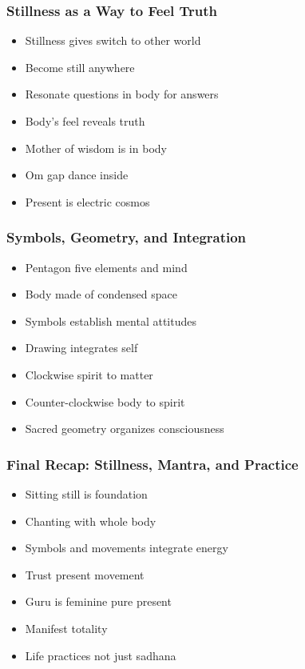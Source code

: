 \begin{frame}[fragile]\frametitle{Stillness as a Way to Feel Truth}
  \begin{itemize}
    \item Stillness gives switch to other world
    \item Become still anywhere
    \item Resonate questions in body for answers
    \item Body's feel reveals truth
    \item Mother of wisdom is in body
    \item Om gap dance inside
    \item Present is electric cosmos
  \end{itemize}
\end{frame}

\begin{frame}[fragile]\frametitle{Symbols, Geometry, and Integration}
  \begin{itemize}
    \item Pentagon five elements and mind
    \item Body made of condensed space
    \item Symbols establish mental attitudes
    \item Drawing integrates self
    \item Clockwise spirit to matter
    \item Counter-clockwise body to spirit
    \item Sacred geometry organizes consciousness
  \end{itemize}
\end{frame}

\begin{frame}[fragile]\frametitle{Final Recap: Stillness, Mantra, and Practice}
  \begin{itemize}
    \item Sitting still is foundation
    \item Chanting with whole body
    \item Symbols and movements integrate energy
    \item Trust present movement
    \item Guru is feminine pure present
    \item Manifest totality
    \item Life practices not just sadhana
  \end{itemize}
\end{frame}

